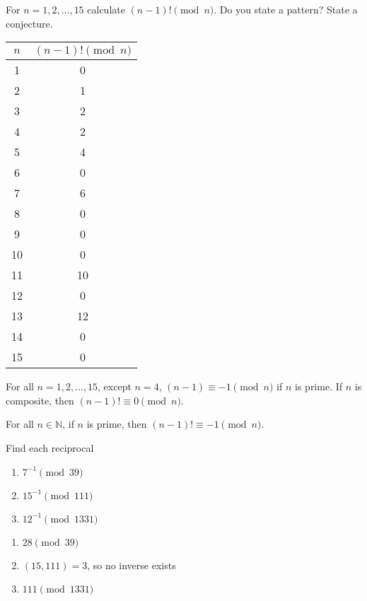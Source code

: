 \documentclass{article}
\begin{document}
\begin{problem}{}{}
    For $n=1,2,\dots,15$ calculate $(n-1)!\pmod{n}$. Do you state a pattern? State a conjecture.
\end{problem}
\begin{solution}{}{}
    \begin{center}
        \begin{tabular}{c|c}
            $n$ & $(n-1)!\pmod{n}$ \\
            \hline
            1 & 0 \\
            2 & 1 \\
            3 & 2 \\
            4 & 2 \\
            5 & 4 \\
            6 & 0 \\
            7 & 6 \\
            8 & 0 \\
            9 & 0 \\
            10 & 0 \\
            11 & 10 \\
            12 & 0 \\
            13 & 12 \\
            14 & 0 \\
            15 & 0 \\
        \end{tabular}
    \end{center}
    For all $n=1,2,\dots,15$, except $n=4$, $(n-1)\equiv-1\pmod{n}$ if $n$ is prime. If $n$ is composite, then $(n-1)!\equiv0\pmod{n}$.
    \begin{conjecture}{}{}
        For all $n\in\mathbb{N}$, if $n$ is prime, then $(n-1)!\equiv-1\pmod{n}$.
    \end{conjecture}
\end{solution}

\begin{problem}{}{}
    Find each reciprocal
    \begin{enumerate}[label=\textbf{\alph*}.]
        \item $7^{-1}\pmod{39}$
        \item $15^{-1}\pmod{111}$
        \item $12^{-1}\pmod{1331}$
    \end{enumerate}
\end{problem}
\begin{solution}{}{}
    \begin{enumerate}[label=\textbf{\alph*}.]
        \item $28\pmod{39}$
        \item $(15,111)=3$, so no inverse exists
        \item $111\pmod{1331}$
    \end{enumerate}
\end{solution}
\end{document}
